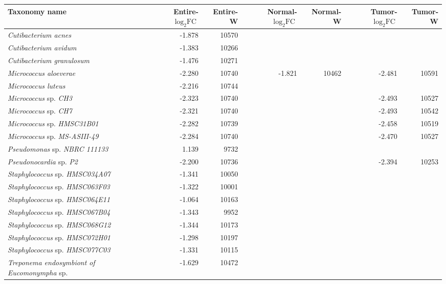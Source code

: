 \begin{tabular}{l|rr|rr|rr}
	Taxonomy name & Entire-$\log _2 \textrm{FC}$ & Entire-W & Normal-$\log _2 \textrm{FC}$ & Normal-W & Tumor-$\log _2 \textrm{FC}$ & Tumor-W \\
\hline
\textit{Cutibacterium acnes} & -1.878 & 10570 &  &  &  &  \\
\textit{Cutibacterium avidum} & -1.383 & 10266 &  &  &  &  \\
\textit{Cutibacterium granulosum} & -1.476 & 10271 &  &  &  &  \\
\textit{Micrococcus aloeverae} & -2.280 & 10740 & -1.821 & 10462 & -2.481 & 10591 \\
\textit{Micrococcus luteus} & -2.216 & 10744 &  &  &  &  \\
\textit{Micrococcus} sp. \textit{CH3} & -2.323 & 10740 &  &  & -2.493 & 10527 \\
\textit{Micrococcus} sp. \textit{CH7} & -2.321 & 10740 &  &  & -2.493 & 10542 \\
\textit{Micrococcus} sp. \textit{HMSC31B01} & -2.282 & 10739 &  &  & -2.458 & 10519 \\
\textit{Micrococcus} sp. \textit{MS-ASIII-49} & -2.284 & 10740 &  &  & -2.470 & 10527 \\
\textit{Pseudomonas} sp. \textit{NBRC 111133} & 1.139 & 9732 &  &  &  &  \\
\textit{Pseudonocardia} sp. \textit{P2} & -2.200 & 10736 &  &  & -2.394 & 10253 \\
\textit{Staphylococcus} sp. \textit{HMSC034A07} & -1.341 & 10050 &  &  &  &  \\
\textit{Staphylococcus} sp. \textit{HMSC063F03} & -1.322 & 10001 &  &  &  &  \\
\textit{Staphylococcus} sp. \textit{HMSC064E11} & -1.064 & 10163 &  &  &  &  \\
\textit{Staphylococcus} sp. \textit{HMSC067B04} & -1.343 & 9952 &  &  &  &  \\
\textit{Staphylococcus} sp. \textit{HMSC068G12} & -1.344 & 10173 &  &  &  &  \\
\textit{Staphylococcus} sp. \textit{HMSC072H01} & -1.298 & 10197 &  &  &  &  \\
\textit{Staphylococcus} sp. \textit{HMSC077C03} & -1.331 & 10115 &  &  &  &  \\
\textit{Treponema endosymbiont of Eucomonympha} sp. & -1.629 & 10472 &  &  &  & 
\end{tabular}